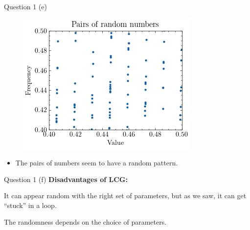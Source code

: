 \documentclass[compress,12pt]{beamer}
\begin{document}
\begin{frame}{Question 1 (e)}
      \begin{figure}
            \centering
            \includegraphics[scale=0.6]{imgs/pairs.png}
      \end{figure}
      \begin{itemize}
            \item The pairs of numbers seem to have a random pattern.
      \end{itemize}
\end{frame}

\begin{frame}{Question 1 (f)}
      \textbf{Disadvantages of LCG:}
      \begin{itemize}
      \begin{tcolorbox}
            \item It can appear random with the right set of parameters, but as we saw, it can get ``stuck'' in a loop.
            \item The randomness depends on the choice of parameters.
        \end{tcolorbox}
      \end{itemize}

    
\end{frame}
\end{document}
